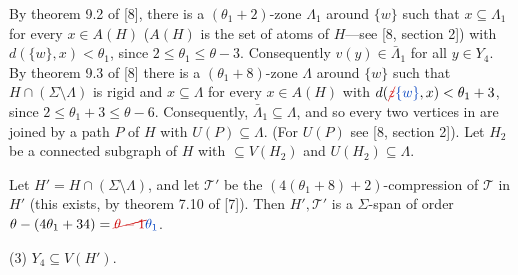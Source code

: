 By theorem 9.2 of [8], there is a $(\theta_1 + 2)$-zone $\Lambda_1$ around $\{w\}$ such that $x \subseteq \Lambda_1$ for every $x \in A(H)$ ($A(H)$ is the set of atoms of $H$---see [8, section 2]) with $d(\{w\}, x) < \theta_1$, since $2 \le \theta_1 \le \theta - 3$. Consequently $v(y) \in \bar{\Lambda}_1$ for all $y \in Y_4$. By theorem 9.3 of [8] there is a $(\theta_1 + 8)$-zone $\Lambda$ around $\{w\}$ such that $H \cap (\Sigma \setminus \Lambda)$ is rigid and $x \subseteq \Lambda$ for every $x \in A(H)$ with $d(\delm{z}\fix{\{w\}}, x) < \theta_1 + 3$, since $2 \le \theta_1 + 3 \le \theta - 6$. Consequently, $\bar{\Lambda}_1 \subseteq \Lambda$, and so every two vertices in   are joined by a path $P$ of $H$ with $U(P) \subseteq \Lambda$. (For $U(P)$ see [8, section 2]). Let $H_2$ be a connected subgraph of $H$ with   $\subseteq V(H_2)$ and $U(H_2) \subseteq \Lambda$.

Let $H' = H \cap (\Sigma \setminus \Lambda)$, and let $\mathcal{T}'$ be the $(4(\theta_1 + 8) + 2)$-compression of $\mathcal{T}$ in $H'$ (this exists, by theorem 7.10 of [7]). Then $H', \mathcal{T}'$ is a $\Sigma$-span of order $\theta - (4\theta_1 + 34) = \delm{\theta - 1}\fix{\theta_1}$.

\hspace*{12pt}(3) $Y_4 \subseteq V(H')$.
